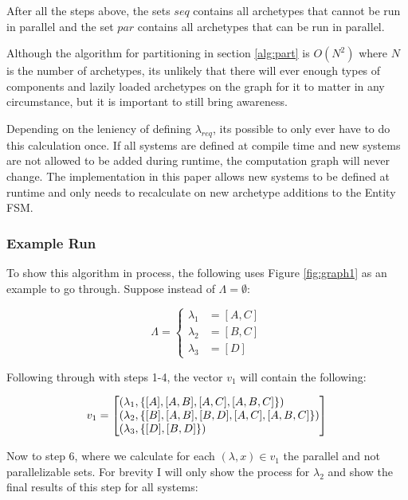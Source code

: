 After all the steps above, the sets $seq$ contains all archetypes that cannot be run in parallel and the set $par$ contains all archetypes that can be run in parallel.

Although the algorithm for partitioning in section \ref{alg:part} is $O(N^2)$ where $N$ is the number of archetypes, its unlikely that there will ever enough types of components and lazily loaded archetypes on the graph for it to matter in any circumstance, but it is important to still bring awareness.

Depending on the leniency of defining $\lambda_{req}$, its possible to only ever have to do this calculation once. If all systems are defined at compile time and new systems are not allowed to be added during runtime, the computation graph will never change. The implementation in this paper allows new systems to be defined at runtime and only needs to recalculate on new archetype additions to the Entity FSM.

\subsubsection{Example Run}
To show this algorithm in process, the following uses Figure \ref{fig:graph1} as an example to go through. Suppose instead of $\Lambda = \emptyset$:

\begin{equation*}
\Lambda = \begin{cases}
    \lambda_1 &= [A,C] \\
    \lambda_2 &= [B,C] \\ 
    \lambda_3 &= [D]    
\end{cases}
\end{equation*}

Following through with steps 1-4, the vector $v_1$ will contain the following:

$$
v_1 = \left[
\begin{array}{@{}l@{}}
(\lambda_1, \{[A],[A,B],[A,C],[A,B,C]\}) \\
(\lambda_2, \{[B],[A,B],[B,D],[A,C],[A,B,C]\})\\
(\lambda_3, \{[D],[B,D]\})
\end{array}
\right]
$$

Now to step 6, where we calculate for each $(\lambda, x) \in v_1$ the parallel and not parallelizable sets. For brevity I will only show the process for $\lambda_2$ and show the final results of this step for all systems:

